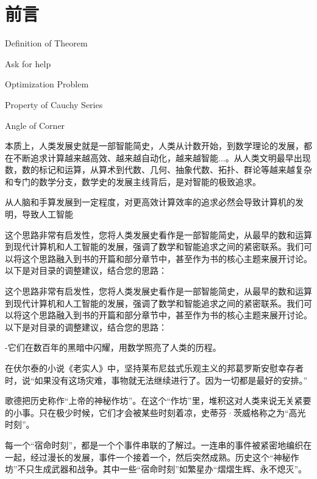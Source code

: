 \chapter{ 前言}

 \begin{introduction}
  \item Definition of Theorem
  \item Ask for help
  \item Optimization Problem
  \item Property of Cauchy Series
  \item Angle of Corner
\end{introduction}



本质上，人类发展史就是一部智能简史，人类从计数开始，到数学理论的发展，都在不断追求计算越来越高效、越来越自动化，越来越智能...。从人类文明最早出现数，数的标记和运算，从算术到代数、几何、抽象代数、拓扑、群论等越来越复杂和专门的数学分支，数学史的发展主线背后，是对智能的极致追求。



从人脑和手算发展到一定程度，对更高效计算效率的追求必然会导致计算机的发明，导致人工智能



这个思路非常有启发性，您将人类发展史看作是一部智能简史，从最早的数和运算到现代计算机和人工智能的发展，强调了数学和智能追求之间的紧密联系。我们可以将这个思路融入到书的开篇和部分章节中，甚至作为书的核心主题来展开讨论。以下是对目录的调整建议，结合您的思路：



这个思路非常有启发性，您将人类发展史看作是一部智能简史，从最早的数和运算到现代计算机和人工智能的发展，强调了数学和智能追求之间的紧密联系。我们可以将这个思路融入到书的开篇和部分章节中，甚至作为书的核心主题来展开讨论。以下是对目录的调整建议，结合您的思路：




-它们在数百年的黑暗中闪耀，用数学照亮了人类的历程。

在伏尔泰的小说《老实人》中，坚持莱布尼兹式乐观主义的邦葛罗斯安慰幸存者时，说“如果没有这场灾难，事物就无法继续进行了。因为一切都是最好的安排。”

歌德把历史称作“上帝的神秘作坊”。在这个“作坊”里，堆积这对人类来说无关紧要的小事。只在极少时候，它们才会被某些时刻着凉，史蒂芬·茨威格称之为“高光时刻”。

每一个“宿命时刻”，都是一个个事件串联的了解过。一连串的事件被紧密地编织在一起，经过漫长的发展，事件一个接着一个，然后突然成熟。历史这个“神秘作坊”不只生成武器和战争。其中一些“宿命时刻”如繁星办“熠熠生辉、永不熄灭”。

